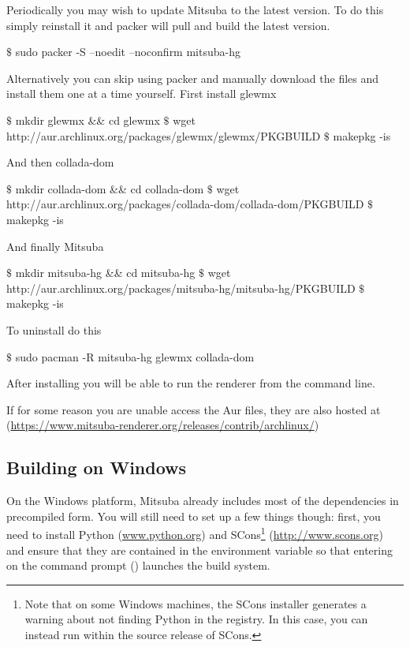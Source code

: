 Periodically you may wish to update Mitsuba to the latest version.
To do this simply reinstall it and packer will pull and build the latest version.
\begin{shell}
$\text{\$}$ sudo packer -S --noedit --noconfirm mitsuba-hg
\end{shell}

Alternatively you can skip using packer and manually download the files and install them one at a time yourself.
First install glewmx
\begin{shell}
$\text{\$}$ mkdir glewmx && cd glewmx
$\text{\$}$ wget http://aur.archlinux.org/packages/glewmx/glewmx/PKGBUILD
$\text{\$}$ makepkg -is
\end{shell}

And then collada-dom
\begin{shell}
$\text{\$}$ mkdir collada-dom && cd collada-dom
$\text{\$}$ wget http://aur.archlinux.org/packages/collada-dom/collada-dom/PKGBUILD
$\text{\$}$ makepkg -is
\end{shell}

And finally Mitsuba
\begin{shell}
$\text{\$}$ mkdir mitsuba-hg && cd mitsuba-hg
$\text{\$}$ wget http://aur.archlinux.org/packages/mitsuba-hg/mitsuba-hg/PKGBUILD
$\text{\$}$ makepkg -is
\end{shell}

To uninstall do this
\begin{shell}
$\text{\$}$ sudo pacman -R mitsuba-hg glewmx collada-dom
\end{shell}

After installing you will be able to run the renderer from the command line.

If for some reason you are unable access the Aur files, they are also hosted at (\url{https://www.mitsuba-renderer.org/releases/contrib/archlinux/})

\subsection{Building on Windows}
On the Windows platform, Mitsuba already includes most of the dependencies in precompiled form.
You will still need to set up a few things though: first, you need to install Python 
(\url{www.python.org}) and SCons\footnote{Note that on some Windows machines, the SCons installer generates a warning about not finding Python in the registry. In this case, you can instead run  within the source release of SCons.} (\url{http://www.scons.org}) and ensure that they are contained in the  environment variable so that entering  on the command prompt () launches the build system.

